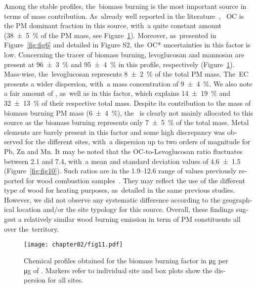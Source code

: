 \begin{otherlanguage}{english}
Among the stable profiles, the~biomass burning is the most important source in terms of
mass contribution. As~already well reported in the
literature~\autocite{schauerMeasurement2001, schmidlChemical2008, belisCritical2013},  ~OC
is the PM dominant fraction in this source, with~a quite constant amount
(\SI{38\pm5}{\percent} of the PM mass, see Figure~\ref{fig:fig11}). Moreover, as~presented
in Figure~\ref{fig:fig6} and detailed in Figure S2, the~OC* uncertainties in this factor
is low. Concerning the tracer of biomass burning,   levoglucosan and mannosan  are present
at \SI{96\pm3}{\percent} and \SI{95\pm4}{\percent} in this profile, respectively
(Figure~\ref{fig:fig11}). Mass-wise, the~levoglucosan represents \SI{8\pm2}{\percent} of
the total PM mass. The~EC presents a wider dispersion, with~a mass concentration of
\SI{9\pm4}{\percent}. We also note a fair amount of , as~well as  in this
factor, which explains \SI{14\pm19}{\percent} and \SI{32\pm13}{\percent} of their
respective total mass. Despite its contribution to the mass of biomass burning PM mass
(\SI{6\pm4}{\percent}), the~ is clearly not mainly allocated to this source as
the biomass burning represents only \SI{7\pm5}{\percent} of the total  mass.
Metal elements are barely present in this factor and some high discrepancy  was observed
for the different sites, with~a dispersion up to two orders of magnitude for Pb, Zn and
Mn.  It may be noted that the OC-to-Levoglucosan ratio fluctuates between 2.1 and 7.4,
with~a mean and standard deviation values of \num{4.6\pm1.5} (Figure~\ref{fig:fig10}).
Such ratios are in the 1.9--12.6 range of values previously reported for \PM{} wood
combustion samples~\autocite{schauerMeasurement2001, schmidlChemical2008}. They may
reflect the use of the different type of wood for heating purposes, as~detailed in the
same previous studies. However, we did not observe any systematic difference according to
the geographical location and/or the site typology for this source.  Overall, these
findings suggest a relatively similar wood burning emission in term of PM constituents all
over the~territory.

\begin{figure}[ht]
    \centering
    \texttt{[image: chapter02/fig11.pdf]}
    \caption{
        Chemical profiles obtained for the biomass burning factor in
        \si{\micro\gram} per \si{\micro\gram} of \PM. Markers refer to
        individual site and box plots show the dispersion for all sites.
    }
    \label{fig:fig11}
\end{figure}

\end{otherlanguage}
